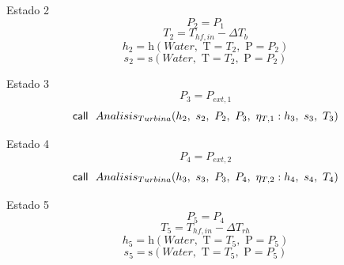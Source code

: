 \documentclass[10pt,fleqn]{article}
\theoremstyle{mytheoremstyle}
\theoremstyle{mytheoremstyle}
\theoremstyle{myproblemstyle}
\newcommand{\F}[1]{\mbox{$#1$}}
\newcommand{\K}[1]{\mbox{\sf#1\ \ \mit}}
\newcommand{\enthalpy}{\mathrm{h}}
\newcommand{\entropy}{\mathrm{s}}
\begin{document}
\vspace{0.10in}
\noindent
{\color{blue} \rm Estado 2}
\begin{equation}
\label{EES Eqn:34}
P_{2}=P_{1} 
\end{equation}
\begin{equation}
\label{EES Eqn:35}
T_{2}=T_{hf,in}-{\Delta T}_{b} 
\end{equation}
\begin{equation}
\label{EES Eqn:36}
h_{2}=\enthalpy \left(\F{Water},\mbox{\ T}=T_{2},\mbox{\ P}=P_{2} \right)  
\end{equation}
\begin{equation}
\label{EES Eqn:37}
s_{2}=\entropy \left(\F{Water},\mbox{\ T}=T_{2},\mbox{\ P}=P_{2} \right)  
\end{equation}

\vspace{0.10in}
\noindent
{\color{blue} \rm Estado 3}
\begin{equation}
\label{EES Eqn:38}
P_{3}=P_{ext,1} 
\end{equation}
\begin{equation}
\label{EES Eqn:39}
\K{call} \F{Analisis_{Turbina}}{ \left( h_{2},\ s_{2},\ P_{2},\ P_{3},\ \eta_{T,1}:h_{3},\ s_{3},\ T_{3} \right) } 
\end{equation}

\vspace{0.10in}
\noindent
{\color{blue} \rm Estado 4}
\begin{equation}
\label{EES Eqn:40}
P_{4}=P_{ext,2} 
\end{equation}
\begin{equation}
\label{EES Eqn:41}
\K{call} \F{Analisis_{Turbina}}{ \left( h_{3},\ s_{3},\ P_{3},\ P_{4},\ \eta_{T,2}:h_{4},\ s_{4},\ T_{4} \right) } 
\end{equation}

\vspace{0.10in}
\noindent
{\color{blue} \rm Estado 5}
\begin{equation}
\label{EES Eqn:42}
P_{5}=P_{4} 
\end{equation}
\begin{equation}
\label{EES Eqn:43}
T_{5}=T_{hf,in}-{\Delta T}_{rh} 
\end{equation}
\begin{equation}
\label{EES Eqn:44}
h_{5}=\enthalpy \left(\F{Water},\mbox{\ T}=T_{5},\mbox{\ P}=P_{5} \right)  
\end{equation}
\begin{equation}
\label{EES Eqn:45}
s_{5}=\entropy \left(\F{Water},\mbox{\ T}=T_{5},\mbox{\ P}=P_{5} \right)  
\end{equation}
\end{document}
